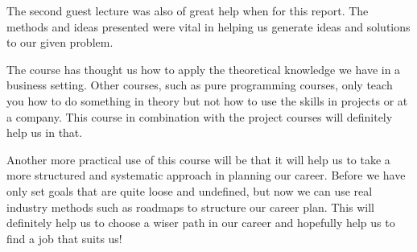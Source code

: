\documentclass{article}
\begin{document}
The second guest lecture was also of great help when for this report. The methods and ideas presented were vital in helping us generate ideas and solutions to our given problem. \smallskip

The course has thought us how to apply the theoretical knowledge we have in a business setting. Other courses, such as pure programming courses, only teach you how to do something in theory but not how to use the skills in projects or at a company. This course in combination with the project courses will definitely help us in that. \smallskip

Another more practical use of this course will be that it will help us to take a more structured and systematic approach in planning our career. Before we have only set goals that are quite loose and undefined, but now we can use real industry methods such as roadmaps to structure our career plan. This will definitely help us to choose a wiser path in our career and hopefully help us to find a job that suits us! 





\end{document}
